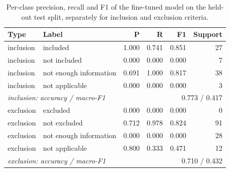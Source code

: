 \begin{table}[t]\centering\footnotesize
\caption{Per-class precision, recall and F1 of the fine-tuned model on the held-out test split, separately for inclusion and exclusion criteria.}\label{tab:perclass}
\begin{tabular}{llrrrr}\toprule
Type & Label & P & R & F1 & Support\\\midrule
inclusion & included & 1.000 & 0.741 & 0.851 & 27 \\
inclusion & not included & 0.000 & 0.000 & 0.000 & 7 \\
inclusion & not enough information & 0.691 & 1.000 & 0.817 & 38 \\
inclusion & not applicable & 0.000 & 0.000 & 0.000 & 3 \\
\multicolumn{2}{l}{\emph{inclusion: accuracy / macro-F1}} & \multicolumn{4}{r}{0.773 / 0.417} \\\midrule
exclusion & excluded & 0.000 & 0.000 & 0.000 & 0 \\
exclusion & not excluded & 0.712 & 0.978 & 0.824 & 91 \\
exclusion & not enough information & 0.000 & 0.000 & 0.000 & 28 \\
exclusion & not applicable & 0.800 & 0.333 & 0.471 & 12 \\
\multicolumn{2}{l}{\emph{exclusion: accuracy / macro-F1}} & \multicolumn{4}{r}{0.710 / 0.432} \\\midrule
\bottomrule\end{tabular}\end{table}

